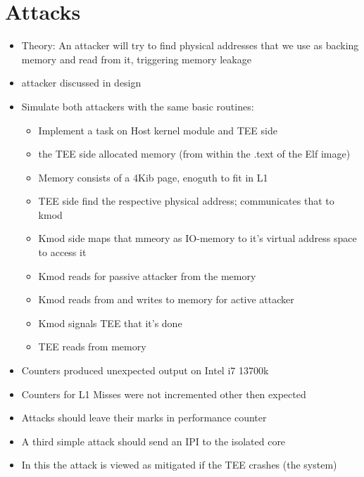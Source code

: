 \section{Attacks}
\label{sec:implementation:attacks}
\begin{itemize}
    \item Theory: An attacker will try to find physical addresses that we use
          as backing memory and read from it, triggering memory leakage
    \item attacker discussed in design
    \item Simulate both attackers with the same basic routines:
          \begin{itemize}
              \item Implement a task on Host kernel module and TEE side
              \item the TEE side allocated memory (from within the .text of the
                    Elf image)
              \item Memory consists of a 4Kib page, enoguth to fit in L1
              \item TEE side find the respective physical address; communicates
                    that to kmod
              \item Kmod side maps that mmeory as IO-memory to it's virtual
                    address space to access it
              \item Kmod reads for passive attacker from the memory
              \item Kmod reads from and writes to memory for active
                    attacker
              \item Kmod signals TEE that it's done
              \item TEE reads from memory
          \end{itemize}
    \item Counters produced unexpected output on Intel i7 13700k
    \item Counters for L1 Misses were not incremented other then
          expected
    \item Attacks should leave their marks in performance counter
    \item A third simple attack should send an IPI to the isolated core
    \item In this the attack is viewed as mitigated if the TEE crashes (the
          system)
\end{itemize}

\cleardoublepage

